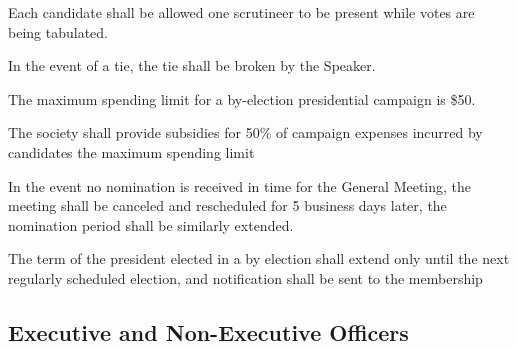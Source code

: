 \begin{longenum}[ label*=\thesubsection.\arabic*., align=left]
	\item Each candidate shall be allowed one scrutineer to be present while votes are being tabulated.
	\item In the event of a tie, the tie shall be broken by the Speaker.
	\item The maximum spending limit for a by-election presidential campaign is \$50.
	\item The society shall provide subsidies for 50\% of campaign expenses incurred by candidates the maximum spending limit
	\item In the event no nomination is received in time for the General Meeting, the meeting shall be canceled and  rescheduled for 5 business days later, the nomination period shall be similarly extended.
	\item The term of the president elected in a by election shall extend only until the next regularly scheduled election, and notification shall be sent to the membership
\end{longenum}

\subsection{Executive and Non-Executive Officers}

